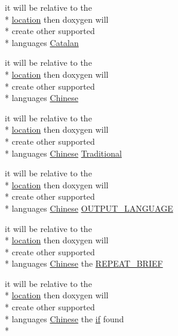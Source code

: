 \begin{DoxyCompactItemize}
it will be relative to the \\*
\hyperlink{glext_8h_a6f0165ed903f22b8bb600c3e0b628e73}{location} then doxygen will \\*
create other supported \\*
languages \hyperlink{sdlgamepad_8dox_ab887b26d09c2ec0872c1e14e2f928a64}{Catalan}
\item 
it will be relative to the \\*
\hyperlink{glext_8h_a6f0165ed903f22b8bb600c3e0b628e73}{location} then doxygen will \\*
create other supported \\*
languages \hyperlink{sdlgamepad_8dox_ab6ff97d2e5e9fa61c208d5f0eee91c62}{Chinese}
\item 
it will be relative to the \\*
\hyperlink{glext_8h_a6f0165ed903f22b8bb600c3e0b628e73}{location} then doxygen will \\*
create other supported \\*
languages \hyperlink{sdlgamepad_8dox_ab6ff97d2e5e9fa61c208d5f0eee91c62}{Chinese} \hyperlink{sdlgamepad_8dox_ab1a4445cb897e49c113c5a2eff77118a}{Traditional}
\item 
it will be relative to the \\*
\hyperlink{glext_8h_a6f0165ed903f22b8bb600c3e0b628e73}{location} then doxygen will \\*
create other supported \\*
languages \hyperlink{sdlgamepad_8dox_ab6ff97d2e5e9fa61c208d5f0eee91c62}{Chinese} \hyperlink{sdlgamepad_8dox_a70b2dc2bbbd06aad351734d9f602edd0}{O\-U\-T\-P\-U\-T\-\_\-\-L\-A\-N\-G\-U\-A\-G\-E}
\item 
it will be relative to the \\*
\hyperlink{glext_8h_a6f0165ed903f22b8bb600c3e0b628e73}{location} then doxygen will \\*
create other supported \\*
languages \hyperlink{sdlgamepad_8dox_ab6ff97d2e5e9fa61c208d5f0eee91c62}{Chinese} the \hyperlink{sdlgamepad_8dox_a97488cf1b604b4e0594c9a044197735c}{R\-E\-P\-E\-A\-T\-\_\-\-B\-R\-I\-E\-F}
\item 
it will be relative to the \\*
\hyperlink{glext_8h_a6f0165ed903f22b8bb600c3e0b628e73}{location} then doxygen will \\*
create other supported \\*
languages \hyperlink{sdlgamepad_8dox_ab6ff97d2e5e9fa61c208d5f0eee91c62}{Chinese} the \hyperlink{qxtdiscoverableservice_8cpp_aa620047247d7e2a6894ad8ad666771de}{if} found \\*

\end{DoxyCompactItemize}
